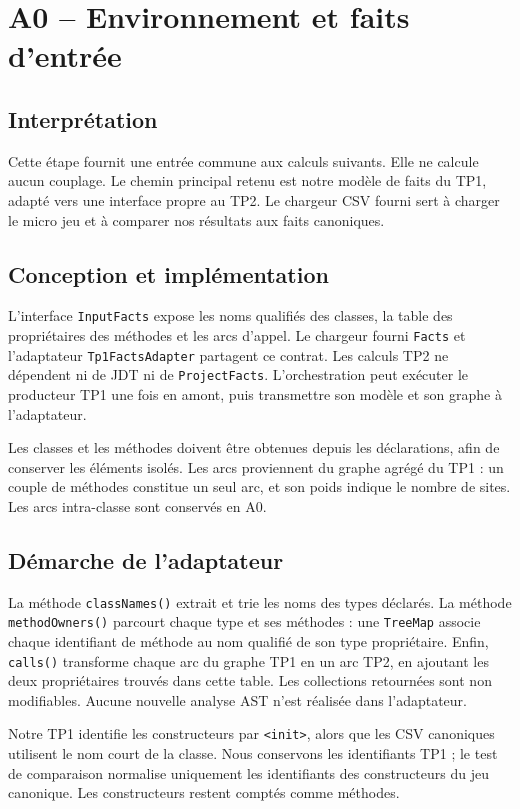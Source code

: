 \documentclass[11pt,a4paper]{article}
\begin{document}
\section{A0 -- Environnement et faits d'entrée}
\subsection{Interprétation}
Cette étape fournit une entrée commune aux calculs suivants. Elle ne calcule
aucun couplage. Le chemin principal retenu est notre modèle de faits du TP1,
adapté vers une interface propre au TP2. Le chargeur CSV fourni sert à charger
le micro jeu et à comparer nos résultats aux faits canoniques.

\subsection{Conception et implémentation}
L'interface \texttt{InputFacts} expose les noms qualifiés des classes, la table
des propriétaires des méthodes et les arcs d'appel. Le chargeur fourni
\texttt{Facts} et l'adaptateur \texttt{Tp1FactsAdapter} partagent ce contrat.
Les calculs TP2 ne dépendent ni de JDT ni de \texttt{ProjectFacts}.
L'orchestration peut exécuter le producteur TP1 une fois en amont, puis transmettre
son modèle et son graphe à l'adaptateur.

Les classes et les méthodes doivent être obtenues depuis les déclarations,
afin de conserver les éléments isolés. Les arcs proviennent du graphe agrégé du
TP1 : un couple de méthodes constitue un seul arc, et son poids indique le
nombre de sites. Les arcs intra-classe sont conservés en A0.

\subsection{Démarche de l'adaptateur}
La méthode \texttt{classNames()} extrait et trie les noms des types déclarés.
La méthode \texttt{methodOwners()} parcourt chaque type et ses méthodes : une
\texttt{TreeMap} associe chaque identifiant de méthode au nom qualifié de son
type propriétaire. Enfin, \texttt{calls()} transforme chaque arc du graphe TP1
en un arc TP2, en ajoutant les deux propriétaires trouvés dans cette table.
Les collections retournées sont non modifiables. Aucune nouvelle analyse AST
n'est réalisée dans l'adaptateur.

Notre TP1 identifie les constructeurs par \texttt{<init>}, alors que les CSV
canoniques utilisent le nom court de la classe. Nous conservons les identifiants
TP1 ; le test de comparaison normalise uniquement les identifiants des
constructeurs du jeu canonique. Les constructeurs restent comptés comme méthodes.
\end{document}
